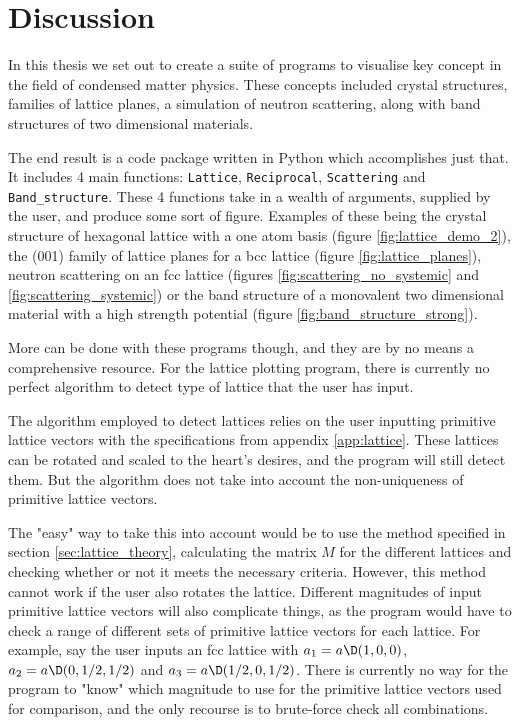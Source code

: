 \documentclass[main.tex]{subfiles}
\begin{document}
	\section{Discussion}
	In this thesis we set out to create a suite of programs to visualise key concept in the field of condensed matter physics. These concepts included crystal structures, families of lattice planes, a simulation of neutron scattering, along with band structures of two dimensional materials.
	
	The end result is a code package written in Python which accomplishes just that. It includes 4 main functions: \texttt{Lattice}, \texttt{Reciprocal}, \texttt{Scattering} and \texttt{Band\_structure}. These 4 functions take in a wealth of arguments, supplied by the user, and produce some sort of figure. Examples of these being the crystal structure of hexagonal lattice with a one atom basis (figure \ref{fig:lattice_demo_2}), the (001) family of lattice planes for a bcc lattice (figure \ref{fig:lattice_planes}), neutron scattering on an fcc lattice (figures \ref{fig:scattering_no_systemic} and \ref{fig:scattering_systemic}) or the band structure of a monovalent two dimensional material with a high strength potential (figure \ref{fig:band_structure_strong}).

	More can be done with these programs though, and they are by no means a comprehensive resource. For the lattice plotting program, there is currently no perfect algorithm to detect type of lattice that the user has input.
	
	The algorithm employed to detect lattices relies on the user inputting primitive lattice vectors with the specifications from appendix \ref{app:lattice}. These lattices can be rotated and scaled to the heart's desires, and the program will still detect them. But the algorithm does not take into account the non-uniqueness of primitive lattice vectors. 
	
	The "easy" way to take this into account would be to use the method specified in section \ref{sec:lattice_theory}, calculating the matrix $ M $ for the different lattices and checking whether or not it meets the necessary criteria. However, this method cannot work if the user also rotates the lattice. Different magnitudes of input primitive lattice vectors will also complicate things, as the program would have to check a range of different sets of primitive lattice vectors for each lattice. For example, say the user inputs an fcc lattice with $ a_1 = a \D(1,0,0) $, $ a_2 = a\D(0, 1/2, 1/2) $ and $ a_3 = a\D(1/2, 0, 1/2) $. There is currently no way for the program to "know" which magnitude to use for the primitive lattice vectors used for comparison, and the only recourse is to brute-force check all combinations.
\end{document}
